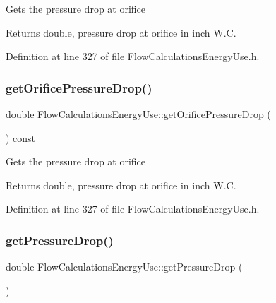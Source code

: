 Gets the pressure drop at orifice

\begin{DoxyReturn}{Returns}
double, pressure drop at orifice in inch W.\+C. 
\end{DoxyReturn}


Definition at line 327 of file Flow\+Calculations\+Energy\+Use.\+h.

\mbox{\label{class_flow_calculations_energy_use_ac42e5918bba0c56406f39437317a2a87}} 
\subsubsection{\texorpdfstring{get\+Orifice\+Pressure\+Drop()}{getOrificePressureDrop()}\hspace{0.1cm}{\footnotesize\ttfamily [3/3]}}
{\footnotesize\ttfamily double Flow\+Calculations\+Energy\+Use\+::get\+Orifice\+Pressure\+Drop (\begin{DoxyParamCaption}{ }\end{DoxyParamCaption}) const\hspace{0.3cm}{\ttfamily [inline]}}

Gets the pressure drop at orifice

\begin{DoxyReturn}{Returns}
double, pressure drop at orifice in inch W.\+C. 
\end{DoxyReturn}


Definition at line 327 of file Flow\+Calculations\+Energy\+Use.\+h.

\mbox{\label{class_flow_calculations_energy_use_a35aa80b2b9ea8769d56bf9e8d5837927}} 
\subsubsection{\texorpdfstring{get\+Pressure\+Drop()}{getPressureDrop()}\hspace{0.1cm}{\footnotesize\ttfamily [1/3]}}
{\footnotesize\ttfamily double Flow\+Calculations\+Energy\+Use\+::get\+Pressure\+Drop (\begin{DoxyParamCaption}{ }\end{DoxyParamCaption})}

